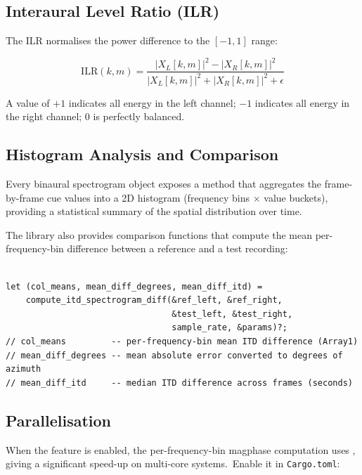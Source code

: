 \subsection{Interaural Level Ratio (ILR)}\label{subsec:ilr}

The ILR normalises the power difference to the $[-1,1]$ range:

\begin{equation}
  \label{eq:ilr}
  \text{ILR}(k, m) = \frac{|X_L[k,m]|^2 - |X_R[k,m]|^2}
  {|X_L[k,m]|^2 + |X_R[k,m]|^2 + \epsilon}
\end{equation}

A value of $+1$ indicates all energy in the left channel; $-1$
indicates all energy in the right channel; $0$ is perfectly balanced.

\subsection{Histogram Analysis and Comparison}\label{subsec:binaural_histogram}

Every binaural spectrogram object exposes a 
method that aggregates the frame-by-frame cue values into a 2D
histogram (frequency bins $\times$ value buckets), providing a
statistical summary of the spatial distribution over time.

The library also provides comparison functions that compute the
mean per-frequency-bin difference between a reference and a test
recording:

\begin{lstlisting}[caption={Mean ITD difference between reference and test}]

let (col_means, mean_diff_degrees, mean_diff_itd) =
    compute_itd_spectrogram_diff(&ref_left, &ref_right,
                                 &test_left, &test_right,
                                 sample_rate, &params)?;
// col_means         -- per-frequency-bin mean ITD difference (Array1)
// mean_diff_degrees -- mean absolute error converted to degrees of azimuth
// mean_diff_itd     -- median ITD difference across frames (seconds)
\end{lstlisting}

\subsection{Parallelisation}\label{subsec:binaural_rayon}

When the  feature is enabled, the per-frequency-bin
magphase computation uses , giving a significant
speed-up on multi-core systems.\ Enable it in \texttt{Cargo.toml}:

